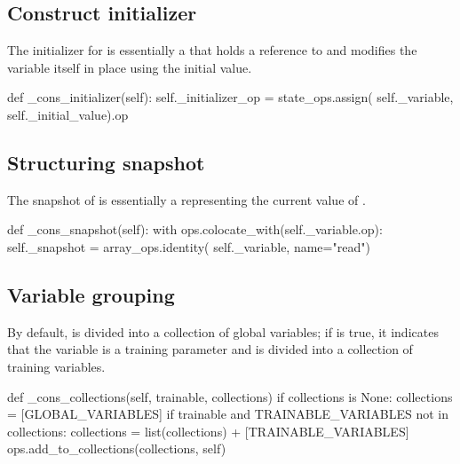 \begin{content}
\subsection{Construct initializer}
The initializer for  is essentially a  that holds a reference to  and modifies the variable itself in place using the initial value.

\begin{leftbar}
\begin{python}
  def _cons_initializer(self):
    self._initializer_op = state_ops.assign(
      self._variable,
      self._initial_value).op
\end{python}
\end{leftbar}


\subsection{Structuring snapshot}
The snapshot of  is essentially a  representing the current value of .

\begin{leftbar}
\begin{python}
  def _cons_snapshot(self):
    with ops.colocate_with(self._variable.op):
      self._snapshot = array_ops.identity(
        self._variable, name="read")
\end{python}
\end{leftbar}


\subsection{Variable grouping}
By default,  is divided into a collection of global variables; if  is true, it indicates that the variable is a training parameter and is divided into a collection of training variables.

\begin{leftbar}
\begin{python}
  def _cons_collections(self, trainable, collections)
    if collections is None:
      collections = [GLOBAL_VARIABLES]
    if trainable and TRAINABLE_VARIABLES not in collections:
      collections = list(collections) + [TRAINABLE_VARIABLES]
    ops.add_to_collections(collections, self)
\end{python}
\end{leftbar}

\end{content}
